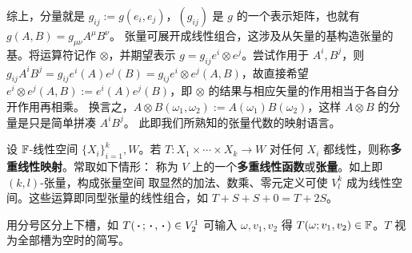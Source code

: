 综上，分量就是 $g_{ij}:=g(e_i,e_j)$，$(g_{ij})$ 是 $g$ 的一个表示矩阵，也就有 $g(A, B)=g_{\mu\nu} A^\mu B^\nu$。
张量可展开成线性组合，这涉及从矢量的基构造张量的基。将运算符记作 $\otimes$，并期望表示 $g=g_{ij} e^i\otimes e^j$。尝试作用于 $A^i,B^j$，则 $g_{ij}A^i B^j=g_{ij} e^i(A)e^j(B)=g_{ij}e^i\otimes e^j(A,B)$，故直接希望 $e^i\otimes e^j(A,B):= e^i(A) e^j(B)$，即 $\otimes$ 的结果与相应矢量的作用相当于各自分开作用再相乘。
换言之，$A\otimes B(\omega_1,\omega_2):=A(\omega_1)B(\omega_2)$，这样 $A\otimes B$ 的分量是只是简单拼凑 $A^i B^j$。
此即我们所熟知的张量代数的映射语言。

\begin{definition}
    设 $\mathbb{F}$-线性空间 $\{X_i\}_{i=1}^k,W$。若
    $T:X_1\times\cdots\times X_k\to W$
    对任何 $X_i$ 都线性，则称\textbf{多重线性映射}。常取如下情形：
    称为 $V$ 上的一个\textbf{多重线性函数}或\textbf{张量}。如上即 $(k,l)$-张量，构成张量空间
    取显然的加法、数乘、零元定义可使 $V^k_l$ 成为线性空间。这些运算即同型张量的线性组合，如 $T+ S+S+0=T+2S$。
\end{definition}


\begin{remark}
    用分号区分上下槽，如 $T(\oo;\oo,\oo)\in V^1_2$ 可输入 $\omega,v_1,v_2$ 得 $T(\omega;v_1,v_2)\in\mathbb{F}$。$T$ 视为全部槽为空时的简写。
\end{remark}


